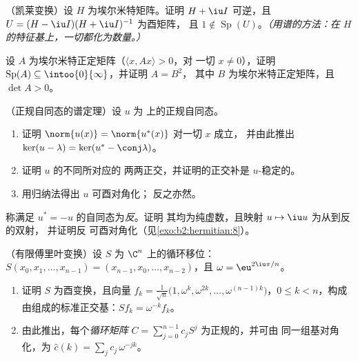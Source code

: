 \begin{exercise}[$\star\star$]\label{exo:b2:hermitian:6}
（凯莱变换）设 $H$ 为埃尔米特矩阵。证明 $H + \iu I$
可逆，且 $U = (H - \iu I)(H + \iu I)^{-1}$ 为酉矩阵，
且 $1 \notin \operatorname{Sp}(U)$。\emph{（用谱的方法：在
$H$ 的特征基上，一切都化为数量。）}
\end{exercise}

\begin{exercise}[$\star\star$]\label{exo:b2:hermitian:7}
设 $A$ 为埃尔米特正定矩阵（$\langle x, Ax\rangle > 0$，对
一切 $x \neq 0$），证明 $\operatorname{Sp}(A) \subseteq
\intoo{0}{\infty}$，并证明 $A = B^2$，
其中 $B$ 为埃尔米特正定矩阵，且 $\det A > 0$。
\end{exercise}

\begin{exercise}[$\star\star\star$]\label{exo:b2:hermitian:8}
（正规自同态的谱定理）设 $u$ 为
上的正规自同态。
\begin{enumerate}
  \item 证明 $\norm{u(x)} = \norm{u^*(x)}$ 对一切 $x$ 成立，
        并由此推出 $\ker(u - \lambda) = \ker(u^* - \conj\lambda)$。
  \item 证明 $u$ 的不同所对应的
        两两正交，并证明的正交补是
        $u$-稳定的。
  \item 用归纳法得出 $u$ 可酉对角化；
        反之亦然。
\end{enumerate}
\end{exercise}

\begin{exercise}[$\star$]\label{exo:b2:hermitian:9}
称满足 $u^* = -u$ 的自同态为\emph{反}。证明
其均为纯虚数，且映射 $u \mapsto \iu
u$ 为从到反的双射，
并证明反
可酉对角化（见\cref{exo:b2:hermitian:8}）。
\end{exercise}

\begin{exercise}[$\star\star$]\label{exo:b2:hermitian:10}
（有限傅里叶变换）设 $S$ 为
$\C^n$ 上的循环移位：$S(x_0, x_1, \dots, x_{n-1}) = (x_{n-1}, x_0, \dots,
x_{n-2})$，且 $\omega = \eu^{2\iu\pi/n}$。
\begin{enumerate}
  \item 证明 $S$ 为酉变换，且向量 $f_k =
        \frac{1}{\sqrt n}\bigl(1, \omega^k, \omega^{2k}, \dots,
        \omega^{(n-1)k}\bigr)$，$0 \leq k < n$，构成
        由组成的标准正交基：$Sf_k = \omega^{-k}
        f_k$。
  \item 由此推出，每个\emph{循环矩阵} $C =
        \sum_{j=0}^{n-1} c_jS^j$ 为正规的，并可由
        同一组基对角化，为 $\widehat c(k) = \sum_j
        c_j\,\omega^{-jk}$。
\end{enumerate}
\end{exercise}

